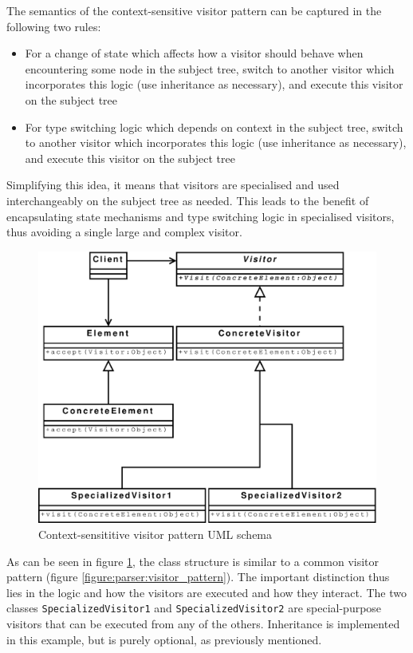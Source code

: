 The semantics of the context-sensitive visitor pattern can be captured in the
following two rules:
\begin{itemize}
  \item For a change of state which affects how a visitor should behave when
  encountering some node in the subject tree, switch to another visitor which
  incorporates this logic (use inheritance as necessary), and execute this
  visitor on the subject tree
  \item For type switching logic which depends on context in the subject tree,
  switch to another visitor which incorporates this logic (use inheritance as
  necessary), and execute this visitor on the subject tree
\end{itemize}

Simplifying this idea, it means that visitors are specialised and used
interchangeably on the subject tree as needed. This leads to the benefit of
encapsulating state mechanisms and type switching logic in specialised
visitors, thus avoiding a single large and complex visitor.

\begin{figure}[h]
  \centering
    \includegraphics[scale=0.40]{diagrams/context_visitor_pattern} 
  \caption{Context-sensititive visitor pattern UML schema}
  \label{figure:parser:context_visitor_pattern}
\end{figure}

As can be seen in figure \ref{figure:parser:context_visitor_pattern}, the
class structure is similar to a common visitor pattern (figure
\ref{figure:parser:visitor_pattern}). The important distinction thus lies in
the logic and how the visitors are executed and how they interact. The two
classes \verb!SpecializedVisitor1! and \verb!SpecializedVisitor2! are
special-purpose visitors that can be executed from any of the others.
Inheritance is implemented in this example, but is purely optional, as
previously mentioned.